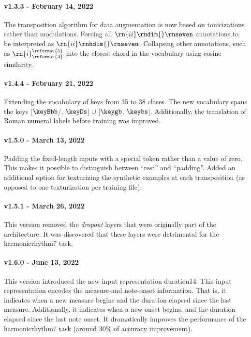 \paragraph{v1.3.3 - February 14, 2022}
The transposition algorithm for data augmentation is now
based on tonicizations rather than modulations. Forcing all
$\rn{ii}\rndim{}\rnseven$ annotations to be interpreted as
$\rn{ii}\rnhdim{}\rnseven$. Collapsing other annotations,
such as $\rn{i}^{\rnformat{5}}_{\rnformat{4}}$ into the
closest chord in the vocabulary using cosine similarity.

\paragraph{v1.4.4 - February 21, 2022}
Extending the vocabulary of keys from 35 to 38 clases. The
new vocabulary spans the keys [$\keyBbb$/, $\keyDs$] $\cup$
[$\keygb$, $\keybs$]. Additionally, the translation of Roman
numeral labels before training was improved.

\paragraph{v1.5.0 - March 13, 2022}
Padding the fixed-length inputs with a special token rather
than a value of zero. This makes it possible to distinguish
between ``rest'' and ``padding''. Added an additional option
for texturizing the synthetic examples at each transposition
(as opposed to one texturization per training file).

\paragraph{v1.5.1 - March 26, 2022}
This version removed the \emph{dropout} layers
\parencite{dahl2013improving} that were originally part of
the architecture. It was discovered that these layers were
detrimental for the \gls{harmonicrhythm7} task.

\paragraph{v1.6.0 - June 13, 2022}
This version introduced the new input representation
\gls{duration14}. This input representation encodes the
measure-and note-onset information. That is, it indicates
when a new measure begins and the duration elapsed since the
last measure. Additionally, it indicates when a new onset
begins, and the duration elapsed since the last note onset.
It dramatically improves the performance of the
\gls{harmonicrhythm7} task (around 30\% of accuracy
improvement).

